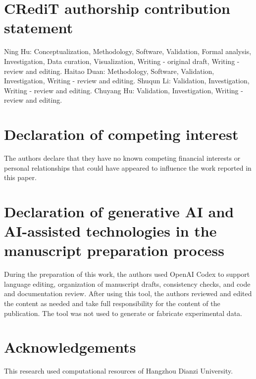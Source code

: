\documentclass[preprint,12pt]{elsarticle}
\begin{document}
\section*{CRediT authorship contribution statement}
Ning Hu: Conceptualization, Methodology, Software, Validation, Formal analysis, Investigation, Data curation, Visualization, Writing - original draft, Writing - review and editing. Haitao Duan: Methodology, Software, Validation, Investigation, Writing - review and editing. Shuqun Li: Validation, Investigation, Writing - review and editing. Chuyang Hu: Validation, Investigation, Writing - review and editing.

\section*{Declaration of competing interest}
The authors declare that they have no known competing financial interests or personal relationships that could have appeared to influence the work reported in this paper.

\section*{Declaration of generative AI and AI-assisted technologies in the manuscript preparation process}
During the preparation of this work, the authors used OpenAI Codex to support language editing, organization of manuscript drafts, consistency checks, and code and documentation review. After using this tool, the authors reviewed and edited the content as needed and take full responsibility for the content of the publication. The tool was not used to generate or fabricate experimental data.

\section*{Acknowledgements}
This research used computational resources of Hangzhou Dianzi University.



\end{document}
